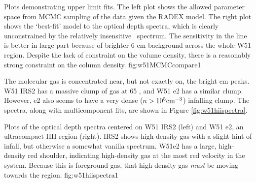 {Plots demonstrating upper limit fits.  The left plot shows the allowed
parameter space from MCMC sampling of the data given the RADEX model.  The
right plot shows the `best-fit' model to the optical depth spectra, which is
clearly unconstrained by the relatively insensitive \twotwo\ spectrum.  The
sensitivity in the \oneone line is better in large part because of brighter 6
cm background across the whole W51 region.  Despite the lack of constraint on the
volume density, there is a reasonably strong constraint on the column density.}
{fig:w51MCMCcompare}{1}

The molecular gas is concentrated near, but not exactly on, the bright cm
peaks.  W51 IRS2 has a massive clump of gas at 65 \kms, and W51 e2 has a
similar clump.  However, e2 also seems to have a very dense ($n>10^5 \textrm{cm}^{-3}$)
infalling clump.  The spectra, along with multicomponent fits, are shown in
Figure \ref{fig:w51hiispectra}.

{Plots of the optical depth spectra centered on W51 IRS2 (left) and W51 e2, an
ultracompact HII region (right).  IRS2 shows high-density gas with a slight
hint of infall, but otherwise a somewhat vanilla spectrum.  W51e2 has a large,
high-density red shoulder, indicating high-density gas at the most red velocity
in the system.  Because this is foreground gas, that high-density gas
\emph{must} be moving towards the \uchii region.}
{fig:w51hiispectra}{1}



